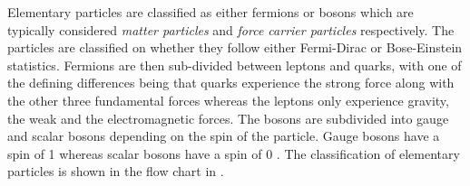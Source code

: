 Elementary particles are classified as either fermions or bosons which are typically considered \textit{matter particles} and \textit{force carrier particles} respectively. The particles are classified on whether they follow either Fermi-Dirac or Bose-Einstein statistics. Fermions are then sub-divided between leptons and quarks, with one of the defining differences being that quarks experience the strong force along with the other three fundamental forces whereas the leptons only experience gravity, the weak and the electromagnetic forces. The bosons are subdivided into gauge and scalar bosons depending on the spin of the particle. Gauge bosons have a spin of 1 whereas scalar bosons have a spin of 0 \cite{Particles_and_Fundamental_Interactions:_An_Introduction_to_Particle_Physics}. The classification of elementary particles is shown in the flow chart in .

